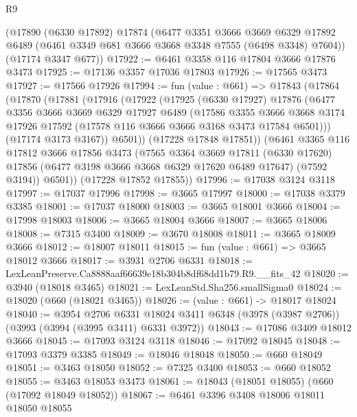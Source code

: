 \begin{lexlean}{R9}
\begin{coremodule}
    (@17890
      (@6330 @17892)
      @17874
      (@6477
        @3351
        @3666
        @3669
        @6329
        @17892
        @6489
        (@6461 @3349 @681 @3666 @3668 @3348 @7555 (@6498 @3348) @7604))
      (@17174 @3347 @677))
@17922 := @6461 @3358 @116 @17804 @3666 @17876 @3473
@17925 := @17136 @3357 @17036 @17803
@17926 := @17565 @3473
@17927 := @17566 @17926
@17994 := fun (value : @661) =>
  @17843
    (@17864
      (@17870
        (@17881
          (@17916
            (@17922
              (@17925
                (@6330 @17927)
                @17876
                (@6477
                  @3356
                  @3666
                  @3669
                  @6329
                  @17927
                  @6489
                  (@17586
                    @3355
                    @3666
                    @3668
                    @3174
                    @17926
                    @17592
                    (@17578 @116 @3666 @3666 @3168 @3473 @17584 @6501)))
                (@17174 @3173 @3167))
              @6501))
          (@17228 @17848 @17851))
        (@6461
          @3365
          @116
          @17812
          @3666
          @17856
          @3473
          (@7565
            @3364
            @3669
            @17811
            (@6330 @17620)
            @17856
            (@6477 @3198 @3666 @3668 @6329 @17620 @6489 @17647)
            (@7592 @3194))
          @6501))
      (@17228 @17852 @17855))
@17996 := @17038 @3124 @3118
@17997 := @17037 @17996
@17998 := @3665 @17997
@18000 := @17038 @3379 @3385
@18001 := @17037 @18000
@18003 := @3665 @18001 @3666
@18004 := @17998 @18003
@18006 := @3665 @18004 @3666
@18007 := @3665 @18006
@18008 := @7315 @3400
@18009 := @3670 @18008
@18011 := @3665 @18009 @3666
@18012 := @18007 @18011
@18015 := fun (value : @661) => @3665 @18012 @3666
@18017 := @3931 @2706 @6331
@18018 := LexLeanPreserve.Ca8888aaf66639e18b304b8df68dd1b79.R9.__fits_42
@18020 := @3940 (@18018 @3465)
@18021 := LexLeanStd.Sha256.smallSigma0
@18024 := @18020 (@660 (@18021 @3465))
@18026 := (value : @661) -> @18017 @18024
@18040 := @3954
    @2706
    @6331
    @18024
    @3411
    @6348
    (@3978 (@3987 @2706))
    (@3993 (@3994 (@3995 @3411) @6331 @3972))
@18043 := @17086 @3409 @18012 @3666
@18045 := @17093 @3124 @3118
@18046 := @17092 @18045
@18048 := @17093 @3379 @3385
@18049 := @18046 @18048
@18050 := @660 @18049
@18051 := @3463 @18050
@18052 := @7325 @3400
@18053 := @660 @18052
@18055 := @3463 @18053 @3473
@18061 := @18043 (@18051 @18055) (@660 (@17092 @18049 @18052))
@18067 := @6461 @3396 @3408 @18006 @18011 @18050 @18055

\end{coremodule}
\end{lexlean}
